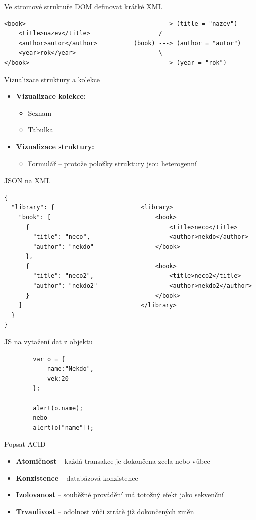 \documentclass[12pt,a4paper,titlepage,final]{article}
\begin{document}
\begin{enumerate}
	{\large \item Ve stromové struktuře DOM definovat krátké XML}
	\begin{verbatim}
<book>                                       -> (title = "nazev")
    <title>nazev</title>                   /
    <author>autor</author>          (book) ---> (author = "autor")
    <year>rok</year>                       \
</book>                                      -> (year = "rok")
	\end{verbatim}
	
	{\large \item Vizualizace struktury a kolekce}
	\begin{itemize}
		\item \textbf{Vizualizace kolekce:} 
		\begin{itemize}
			\item Seznam
			\item Tabulka	
		\end{itemize}
		\item \textbf{Vizualizace struktury:} 
		\begin{itemize}
			\item Formulář -- protože položky struktury jsou heterogenní	
		\end{itemize}
	\end{itemize}
	
	{\large \item JSON na XML}
	\begin{verbatim} 
{
  "library": {                        <library>
    "book": [                             <book>
      {                                       <title>neco</title>
        "title": "neco",                      <author>nekdo</author>
        "author": "nekdo"                 </book>
      },                 
      {                                   <book>
        "title": "neco2",                     <title>neco2</title>
        "author": "nekdo2"                    <author>nekdo2</author>
      }                                   </book>
    ]                                 </library>
  }
}
	\end{verbatim}
		
	{\large \item JS na vytažení dat z objektu}
	\begin{verbatim}
		var o = {
		    name:"Nekdo",
		    vek:20
		};
		
		alert(o.name);
		nebo
		alert(o["name"]);
	\end{verbatim}
	
	{\large \item Popsat ACID}
	\begin{itemize}
		\item \textbf{Atomičnost} -- každá transakce je dokončena zcela nebo vůbec
		\item \textbf{Konzistence} -- databázová konzistence
		\item \textbf{Izolovanost} -- souběžné provádění má totožný efekt jako sekvenční
		\item \textbf{Trvanlivost} -- odolnost vůči ztrátě již dokončených změn 	
	\end{itemize}
	

\end{enumerate}
\end{document}
